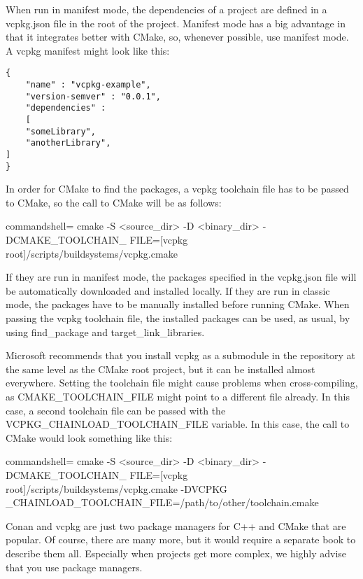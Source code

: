 When run in manifest mode, the dependencies of a project are defined in a vcpkg.json file in the root of the project. Manifest mode has a big advantage in that it integrates better with CMake, so, whenever possible, use manifest mode. A vcpkg manifest might look like this:

\begin{lstlisting}[style=styleCMake]
{
	"name" : "vcpkg-example",
	"version-semver" : "0.0.1",
	"dependencies" :
	[
	"someLibrary",
	"anotherLibrary",
] 
}
\end{lstlisting}

In order for CMake to find the packages, a vcpkg toolchain file has to be passed to CMake, so the call to CMake will be as follows:

\begin{tcblisting}{commandshell={}}
cmake -S <source_dir> -D <binary_dir> -DCMAKE_TOOLCHAIN_
  FILE=[vcpkg root]/scripts/buildsystems/vcpkg.cmake
\end{tcblisting}

If they are run in manifest mode, the packages specified in the vcpkg.json file will be automatically downloaded and installed locally. If they are run in classic mode, the packages have to be manually installed before running CMake. When passing the vcpkg toolchain file, the installed packages can be used, as usual, by using find\_package and target\_link\_libraries.

Microsoft recommends that you install vcpkg as a submodule in the repository at the same level as the CMake root project, but it can be installed almost everywhere. Setting the toolchain file might cause problems when cross-compiling, as CMAKE\_TOOLCHAIN\_FILE might point to a different file already. In this case, a second toolchain file can be passed with the VCPKG\_CHAINLOAD\_TOOLCHAIN\_FILE variable. In this case, the call to CMake would look something like this:

\begin{tcblisting}{commandshell={}}
cmake -S <source_dir> -D <binary_dir> -DCMAKE_TOOLCHAIN_
  FILE=[vcpkg root]/scripts/buildsystems/vcpkg.cmake -DVCPKG
  _CHAINLOAD_TOOLCHAIN_FILE=/path/to/other/toolchain.cmake
\end{tcblisting}

Conan and vcpkg are just two package managers for C++ and CMake that are popular. Of course, there are many more, but it would require a separate book to describe them all. Especially when projects get more complex, we highly advise that you use package managers.

